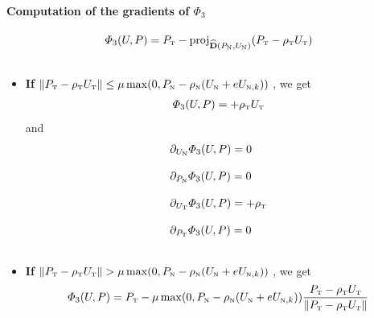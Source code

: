 \paragraph{Computation of the gradients of $\Phi_3$}
\begin{equation}
  \label{eq:AC-TT1}
  \begin{array}{l}
  \varPhi_3(U,P) =  P_{\t} - \proj_{\widehat {\bf D}(P_{\n},U_{\n})} (P_{\t} - \rho_{\t} U_{\t} ) \\ \\
\end{array}
\end{equation}
\begin{itemize}
\item \textbf{If} $\|P_{\t} - \rho_{\t} U_{\t}\| \leq \mu \max (0 ,P_{\n} - \rho_{\n} (U_{\n} +e  U_{\n,k}) ) $  , we get
\begin{equation}
  \label{eq:AC-TT2}
  \begin{array}{l}
  \varPhi_3(U,P) =  + \rho_{\t} U_{\t}
\end{array}
\end{equation}
and
 \begin{equation}
    \label{eq:AC-TT3}
    \begin{array}{l}
     \partial_{U_{\n}} \varPhi_3(U,P) =  0 \\ \\
     \partial_{P_{\n}} \varPhi_3(U,P) =  0 \\ \\
     \partial_{U_{\t}} \varPhi_3(U,P) =  + \rho_{\t} \\ \\
     \partial_{P_{\t}} \varPhi_3(U,P) =  0 \\ \\
    \end{array}
  \end{equation}
\item \textbf{If} $\|P_{\t} - \rho_{\t} U_{\t}\| > \mu \max (0 ,P_{\n} - \rho_{\n} (U_{\n} +e  U_{\n,k}) ) $  , we get
\begin{equation}
  \label{eq:AC-TT4}
  \begin{array}{l}
  \varPhi_3(U,P) =  P_{\t} - \mu \max(0,P_{\n} - \rho_{\n} (U_{\n} +e  U_{\n,k}) )  \Frac{P_{\t} - \rho_{\t} U_{\t} }{ \| P_{\t} - \rho_{\t} U_{\t}\| }
\end{array}
\end{equation}


\end{itemize}
